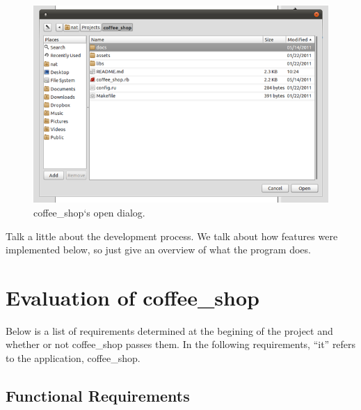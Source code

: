 \documentclass[10pt]{article}
\begin{document}
\begin{figure}
   \centering
      \includegraphics[width=130mm]{images/coffee_shop7.png}
   \caption{coffee\_shop`s open dialog.}
\end{figure}

Talk a little about the development process. We talk about how features were implemented below, so just give an overview of what the program does.

\section{Evaluation of coffee\_shop}

Below is a list of requirements determined at the begining of the project and whether or not coffee\_shop passes them. In the following requirements, ``it'' refers to the application, coffee\_shop.

\subsection{Functional Requirements}
\end{document}
